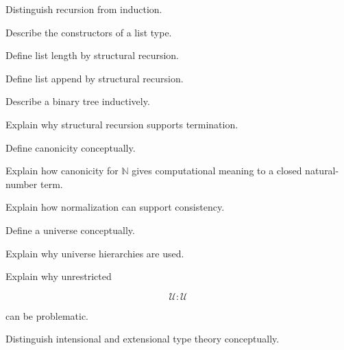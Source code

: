 \begin{exercise}[3]
Distinguish recursion from induction.
\end{exercise}

\begin{exercise}[2]
Describe the constructors of a list type.
\end{exercise}

\begin{exercise}[3]
Define list length by structural recursion.
\end{exercise}

\begin{exercise}[3]
Define list append by structural recursion.
\end{exercise}

\begin{exercise}[3]
Describe a binary tree inductively.
\end{exercise}

\begin{exercise}[3]
Explain why structural recursion supports termination.
\end{exercise}

\begin{exercise}[3]
Define canonicity conceptually.
\end{exercise}

\begin{exercise}[3]
Explain how canonicity for \(\mathbb{N}\) gives computational meaning to a
closed natural-number term.
\end{exercise}

\begin{exercise}[3]
Explain how normalization can support consistency.
\end{exercise}

\begin{exercise}[2]
Define a universe conceptually.
\end{exercise}

\begin{exercise}[3]
Explain why universe hierarchies are used.
\end{exercise}

\begin{exercise}[3]
Explain why unrestricted

\[
\mathcal{U}:\mathcal{U}
\]

can be problematic.
\end{exercise}

\begin{exercise}[3]
Distinguish intensional and extensional type theory conceptually.
\end{exercise}

